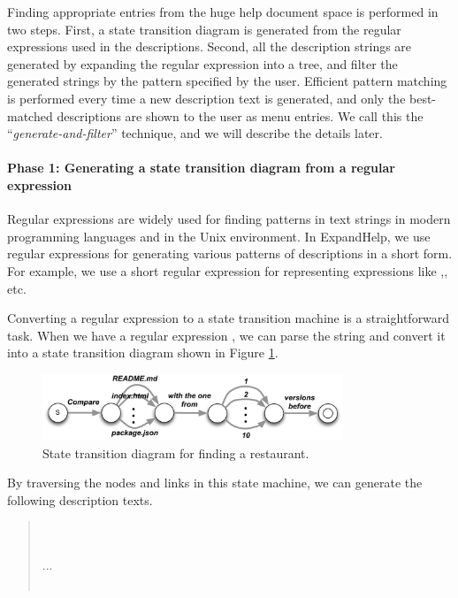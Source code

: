 \documentclass{sigchi}
\def\EH{\textsf{ExpandHelp}}
\begin{document}
Finding appropriate entries from the huge help document space is performed in two steps.
First, a state transition diagram is generated from the regular expressions
used in the descriptions.
Second, all the description strings are generated by expanding the regular expression
into a tree, and filter the generated strings by the pattern specified by the user.
Efficient pattern matching is performed every time a new description text is generated,
and only the best-matched descriptions are shown to the user as menu entries.
We call this the ``\textit{generate-and-filter}'' technique,
and we will describe the details later.

\paragraph{Phase 1: Generating a state transition diagram from a regular expression}

Regular expressions are widely used for finding patterns in text strings
in modern programming languages and in the Unix environment.
In {\EH}, we use regular expressions for
generating various patterns of descriptions in a short form.
For example, we use a short regular expression
for representing expressions like
,, etc.

Converting a regular expression to a state transition machine is a straightforward task.
When we have a regular expression
, 
we can parse the string and convert it into a state transition diagram
shown in Figure \ref{statemachine1}.

\begin{figure}[htb]
\includegraphics[width=90mm,bb=0 0 571 126]{figures/statemachine.pdf}
\caption{State transition diagram for finding a restaurant.}
\label{statemachine1}
\end{figure}

By traversing the nodes and links in this state machine,
we can generate the following description texts.

\begin{quote}
\small
{} \\
 \\
...\\
\\
\end{quote}
\end{document}
